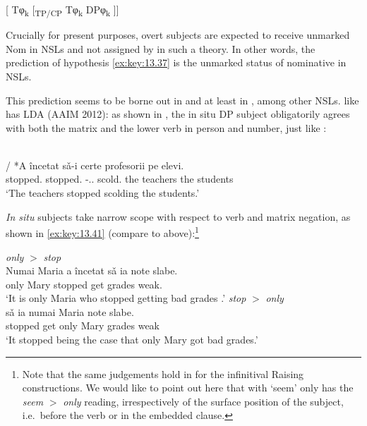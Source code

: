 \documentclass[output=paper]{langsci/langscibook}
\begin{document}
\begin{exe}
\ea\label{ex:key:13.39}
    {}[ Tφ\textsubscript{k} [\textsubscript{TP/CP} Tφ\textsubscript{k} DPφ\textsubscript{k} ]]
\z

Crucially for present purposes, overt subjects are expected to receive unmarked
Nom in \glspl{NSL} and not \Nom{} assigned by  in such a theory. In other words, the
prediction of hypothesis \eqref{ex:key:13.37} is the unmarked status of nominative
in NSLs.

This prediction seems to be borne out in  and at least in , among
other NSLs.  like  has \gls{LDA} (AAIM 2012): as shown in
, the in situ DP subject obligatorily agrees with both the
matrix and the lower verb in person and number, just like :

\ea\label{ex:key:13.40}\\
     / {*A încetat} sǎ-i certe profesorii pe elevi.\\
    stopped.\Tpl{} {} \hphantom{*}stopped.\Tsg{} \Sbjv{}-\Cl{}.\Tpl{}.\Acc{} scold.\Tpl{} {the teachers} the students\\
    \glt ‘The teachers stopped scolding the students.’
\z

\emph{In situ} subjects take narrow scope with respect to  verb and
matrix negation, as shown in \eqref{ex:key:13.41} (compare to 
above):\footnote{Note that the same judgements hold in  for the
    infinitival Raising constructions. We would like to point out here that
    with `seem'  only has the \emph{seem} $>$ \emph{only} reading,
irrespectively of the surface position of the subject, i.e.\ before the 
verb or in the embedded clause.}

\ea%
    \label{ex:key:13.41}
    \ea \emph{only} $>$ \emph{stop}\\
    \gll   Numai Maria {a încetat} sǎ   ia note slabe.\\
	    only Mary stopped \Sbjv{} get grades weak.\\
	\glt     ‘It is only Maria who stopped getting bad grades .’
    \ex \emph{stop} $>$ \emph{only}\\
     sǎ  ia numai Maria note slabe.\\
	    stopped \Sbjv{} get only Mary grades weak\\
	\glt     ‘It stopped being the case that only Mary got bad grades.’
    \z
\z


\end{exe}
\end{document}

